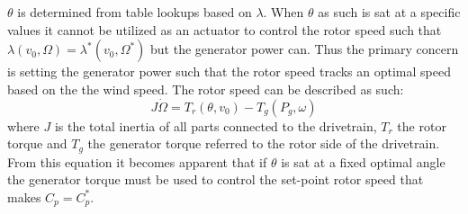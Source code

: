 $ \theta $ is determined from table lookups based on $ \lambda $. When $ \theta $ as such is sat at a specific values it cannot be utilized as an actuator to control the rotor speed such that $ \lambda(v_0, \Omega) = \lambda^*(v_0, \Omega^*) $ but the generator power can. Thus the primary concern is setting the generator power such that the rotor speed tracks an optimal speed based on the the wind speed. The rotor speed can be described as such:
\begin{equation}\label{eq:plc_rotor_speed}
	J \dot{\Omega} = T_r(\theta, v_0) - T_g(P_g, \omega)
\end{equation}
where $ J $ is the total inertia of all parts connected to the drivetrain, $ T_r $ the rotor torque and $ T_g $ the generator torque referred to the rotor side of the drivetrain. From this equation it becomes apparent that if $ \theta $ is sat at a fixed optimal angle the generator torque must be used to control the set-point rotor speed that makes $ C_p = C_p^* $.


